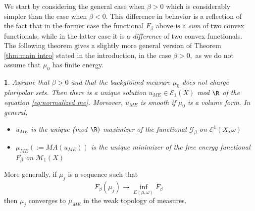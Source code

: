\documentclass[11pt,oneside,english]{amsart}
\numberwithin{equation}{section}
\numberwithin{figure}{section}
\theoremstyle{plain}
\newtheorem{thm}{\protect\theoremname}[section]
\theoremstyle{plain}
\theoremstyle{plain}
\theoremstyle{plain}
\theoremstyle{remark}
\theoremstyle{definition}
\providecommand{\theoremname}{Theorem}
\begin{document}
We start by considering the general case when $\beta>0$ which is
considerably simpler than the case when $\beta<0.$ This difference
in behavior is a reflection of the fact that in the former case the
functional $F_{\beta}$ above is a \emph{sum} of two convex functionals,
while in the latter case it is a \emph{difference} of two convex functionals.
The following theorem gives a slightly more general version of Theorem
\ref{thm:main intro} stated in the introduction, in the case $\beta>0,$
as we do not assume that $\mu_{0}$ has finite energy. 
\begin{thm}
\label{thm:existence etc when beta pos}Assume that $\beta>0$ and
that the background measure $\mu_{0}$ does not charge pluripolar
sets. Then there is a unique solution $u_{ME}\in\mathcal{E}_{1}(X)$
mod $\R$ of the  equation \ref{eq:normalized me}. Moreover, $u_{ME}$
is smooth if $\mu_{0}$ is a volume form. In general, 
\begin{itemize}
\item $u_{ME}$ is the unique (mod $\R)$ maximizer of the functional $\mathcal{G_{\beta}}$
on $\mathcal{E}^{1}(X,\omega)$ 
\item $\mu_{ME}(:=MA(u_{ME}))$ is the unique minimizer of the free energy
functional $F_{\beta}$ on $\mathcal{M}_{1}(X)$ 
\end{itemize}
\end{thm}
More generally, if $\mu_{j}$ is a sequence such that 
\[
F_{\beta}(\mu_{j})\rightarrow\inf_{E(\mu,\omega)}F_{\beta}
\]
 then $\mu_{j}$ converges to $\mu_{ME}$ in the weak topology of
measures. 
\end{document}
